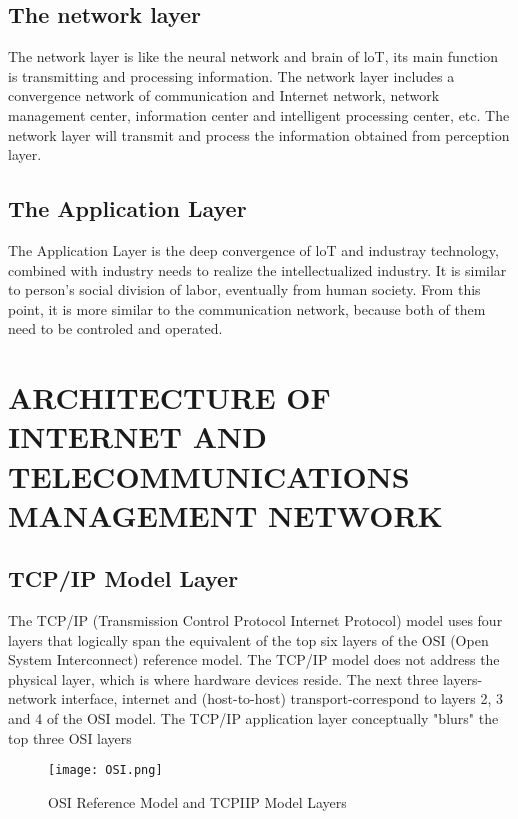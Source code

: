 \documentclass{article}
\begin{document}
\subsection{The network layer}

The network layer is like the neural network and brain of loT, its main function is transmitting and processing information. The network layer includes a convergence network of communication and Internet network, network management center, information center and intelligent processing center, etc. The network layer will transmit and process the information obtained from perception layer.



\subsection{The Application Layer}

The Application Layer is the deep convergence of loT and industray technology, combined with industry needs to realize the intellectualized industry. It is similar to person's social division of labor, eventually from human society. From this point, it is more similar to the communication network, because both of them need to be controled and operated.



\section{ARCHITECTURE OF INTERNET AND TELECOMMUNICATIONS MANAGEMENT NETWORK}
\subsection{TCP/IP Model Layer}

The TCP/IP (Transmission Control Protocol Internet Protocol) model uses four layers that logically span the equivalent of the top six layers of the OSI (Open System Interconnect) reference model. The TCP/IP model does not address the physical layer, which is where hardware devices reside. The next three layers-network interface, internet and (host-to-host) transport-correspond to layers 2, 3 and 4 of the OSI model. The TCP/IP application layer conceptually "blurs" the top three OSI layers 

\begin{figure}[h]
\centering
\texttt{[image: OSI.png]}
\caption{\label{fig:frog}OSI Reference Model and TCPIIP Model Layers}
\end{figure}
\end{document}
